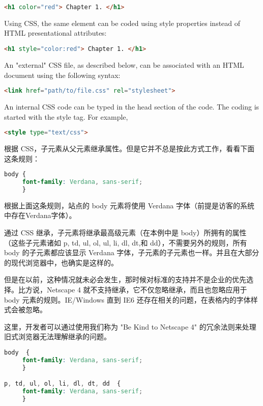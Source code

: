 \begin{lstlisting}[language=HTML]
<h1 color="red"> Chapter 1. </h1>
\end{lstlisting}


Using CSS, the same element can be coded using style properties instead of HTML presentational attributes:


\begin{lstlisting}[language=HTML]
<h1 style="color:red"> Chapter 1. </h1>
\end{lstlisting}

An "external" CSS file, as described below, can be associated with an HTML document using the following syntax:


\begin{lstlisting}[language=HTML]
<link href="path/to/file.css" rel="stylesheet">
\end{lstlisting}


An internal CSS code can be typed in the head section of the code. The coding is started with the style tag. For example,


\begin{lstlisting}[language=HTML]
<style type="text/css">
\end{lstlisting}

根据 CSS，子元素从父元素继承属性。但是它并不总是按此方式工作，看看下面这条规则：

\begin{lstlisting}[language=CSS]
body {
     font-family: Verdana, sans-serif;
     }
\end{lstlisting}

根据上面这条规则，站点的 body 元素将使用 Verdana 字体（前提是访客的系统中存在Verdana字体）。

通过 CSS 继承，子元素将继承最高级元素（在本例中是 body）所拥有的属性（这些子元素诸如 p, td, ul, ol, ul, li, dl, dt,和 dd），不需要另外的规则，所有 body 的子元素都应该显示 Verdana 字体，子元素的子元素也一样。并且在大部分的现代浏览器中，也确实是这样的。

但是在以前，这种情况就未必会发生，那时候对标准的支持并不是企业的优先选择。比方说，Netscape 4 就不支持继承，它不仅忽略继承，而且也忽略应用于 body 元素的规则。IE/Windows 直到 IE6 还存在相关的问题，在表格内的字体样式会被忽略。

这里，开发者可以通过使用我们称为 "Be Kind to Netscape 4" 的冗余法则来处理旧式浏览器无法理解继承的问题。

\begin{lstlisting}[language=CSS]
body  {
     font-family: Verdana, sans-serif;
     }

p, td, ul, ol, li, dl, dt, dd  {
     font-family: Verdana, sans-serif;
     }
\end{lstlisting}

